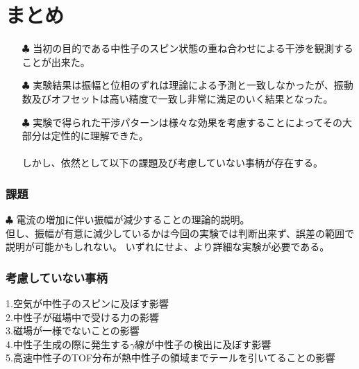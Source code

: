 
\section{まとめ}
\begin{itemize}
\item[$\clubsuit$]当初の目的である中性子のスピン状態の重ね合わせによる干渉を観測することが出来た。\\
\item[$\clubsuit$]実験結果は振幅と位相のずれは理論による予測と一致しなかったが、振動数及びオフセットは高い精度で一致し非常に満足のいく結果となった。\\
\item[$\clubsuit$]実験で得られた干渉パターンは様々な効果を考慮することによってその大部分は定性的に理解できた。\\
\\
しかし、依然として以下の課題及び考慮していない事柄が存在する。
\end{itemize}
\subsubsection{課題}
$\clubsuit$
電流の増加に伴い振幅が減少することの理論的説明。\\
但し、振幅が有意に減少しているかは今回の実験では判断出来ず、誤差の範囲で説明が可能かもしれない。
いずれにせよ、より詳細な実験が必要である。
\subsubsection{考慮していない事柄}
\hspace{-9.5pt}1.空気が中性子のスピンに及ぼす影響\\
2.中性子が磁場中で受ける力の影響\\
3.磁場が一様でないことの影響\\
4.中性子生成の際に発生する$\gamma$線が中性子の検出に及ぼす影響\\
5.\mbox{高速中性子のTOF分布が熱中性子の領域までテールを引いてることの影響}\\
